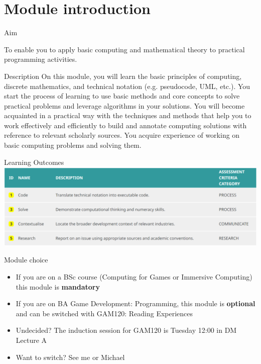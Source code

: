 \part{Module introduction}
\frame{\partpage}

\begin{frame}{Aim}
\begin{center}
To enable you to apply basic computing and mathematical theory to practical programming activities.
\end{center}
\end{frame}

\begin{frame}{Description}
On this module, you will learn the basic principles of computing, discrete mathematics, and technical notation (e.g. pseudocode, UML, etc.). You start the process of learning to use basic methods and core concepts to solve practical problems and leverage algorithms in your solutions. You will become acquainted in a practical way with the techniques and methods that help you to work effectively and efficiently to build and annotate computing solutions with reference to relevant scholarly sources. You acquire experience of working on basic computing problems and solving them.
\end{frame}

\begin{frame}{Learning Outcomes}
	\includegraphics[width=\textwidth]{learning_outcomes}
\end{frame}

\begin{frame}{Module choice}
	\begin{itemize}
		\pause\item If you are on a BSc course (Computing for Games or Immersive Computing) this module is \textbf{mandatory}
		\pause\item If you are on BA Game Development: Programming, this module is \textbf{optional} and can be switched with GAM120: Reading Experiences
		\pause\item Undecided? The induction session for GAM120 is Tuesday 12:00 in DM Lecture A
		\pause\item Want to switch? See me or Michael
	\end{itemize}
\end{frame}


